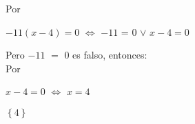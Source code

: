 \documentclass[12pt]{article}
\begin{document}
Por {}

\begin{center}
   
   $-11(x - 4) = 0$  $\Leftrightarrow$ $-11$ = $0$ $\vee$ $x - 4 = 0$  
   
\end{center}

Pero $-11$ $=$ $0$ es falso, entonces:\\

Por {}

\begin{center}
   
   $x - 4 = 0$ $\Leftrightarrow$ $ x=4 $ 
   
\end{center}

{}

\begin{center}
   
  $\left\{4\right\}$ 
   
\end{center}
\end{document}
